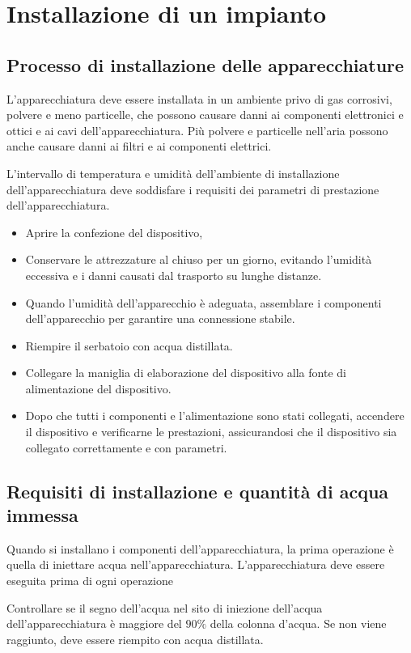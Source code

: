 \documentclass[10pt]{article}
\begin{document}
\section{Installazione di un impianto}
\subsection{Processo di installazione delle apparecchiature}

L'apparecchiatura deve essere installata in un ambiente privo di gas corrosivi, polvere e meno particelle, che possono causare danni ai componenti elettronici e ottici e ai cavi dell'apparecchiatura. Più polvere e particelle nell'aria possono anche causare danni ai filtri e ai componenti elettrici.

L'intervallo di temperatura e umidità dell'ambiente di installazione dell'apparecchiatura deve soddisfare i requisiti dei parametri di prestazione dell'apparecchiatura.

\begin{itemize}
  \item Aprire la confezione del dispositivo,
  \item Conservare le attrezzature al chiuso per un giorno, evitando l'umidità eccessiva e i danni causati dal trasporto su lunghe distanze.
  \item Quando l'umidità dell'apparecchio è adeguata, assemblare i componenti dell'apparecchio per garantire una connessione stabile.
  \item Riempire il serbatoio con acqua distillata.
  \item Collegare la maniglia di elaborazione del dispositivo alla fonte di alimentazione del dispositivo.
  \item Dopo che tutti i componenti e l'alimentazione sono stati collegati, accendere il dispositivo e verificarne le prestazioni, assicurandosi che il dispositivo sia collegato correttamente e con parametri.
\end{itemize}

\subsection{Requisiti di installazione e quantità di acqua immessa}
Quando si installano i componenti dell'apparecchiatura, la prima operazione è quella di iniettare acqua nell'apparecchiatura. L'apparecchiatura deve essere eseguita prima di ogni operazione

Controllare se il segno dell'acqua nel sito di iniezione dell'acqua dell'apparecchiatura è maggiore del $90 \%$ della colonna d'acqua. Se non viene raggiunto, deve essere riempito con acqua distillata.
\end{document}
